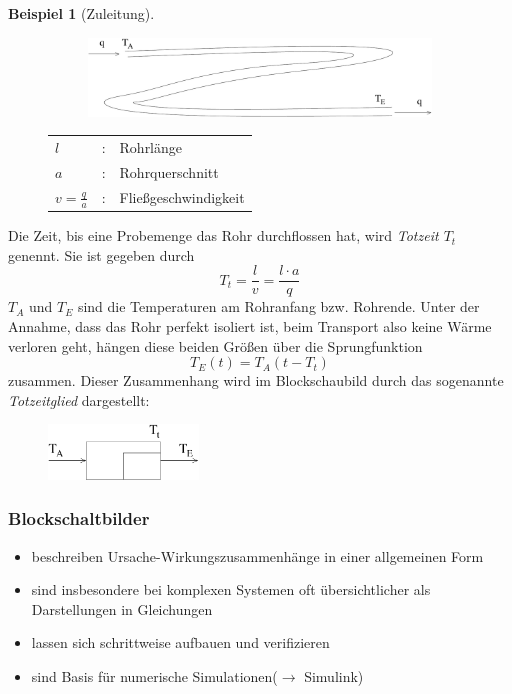\documentclass[12pt,a4paper,ngerman]{scrartcl}
\newtheorem{bsp}{Beispiel}[section] %
\begin{document}
\begin{bsp}[Zuleitung]
\end{bsp}
\begin{figure}[H]
\begin{minipage}{.6\linewidth}
\begin{figure}[H]
 \includegraphics[width=.9\linewidth]{sysregel_bsp_5} 
\end{figure}
\end{minipage}
\begin{minipage}{.4\linewidth}
\begin{tabular}{lll}
$l$&:& Rohrlänge\\
$a$&:&Rohrquerschnitt\\
$v=\frac{q}{a}$&:& Fließgeschwindigkeit
\end{tabular}
\end{minipage}
\end{figure}

Die Zeit, bis eine Probemenge das Rohr durchflossen hat, wird \emph{Totzeit $T_t$} genennt. Sie ist gegeben durch
\begin{equation*}
  T_t=\frac{l}{v}=\frac{l \cdot a}{q}
\end{equation*}
$T_A$ und $T_E$ sind die Temperaturen am Rohranfang bzw. Rohrende. Unter der Annahme, dass das Rohr perfekt isoliert ist, beim Transport also keine Wärme verloren geht, hängen diese beiden Größen über die Sprungfunktion
\begin{equation*}
  T_E(t)=T_A(t-T_t)
\end{equation*}
zusammen. Dieser Zusammenhang wird im Blockschaubild durch das sogenannte \emph{Totzeitglied} dargestellt:
\begin{figure}[H]
  \includegraphics[width=4cm]{sysregel_tglied}
\end{figure}
\fancyhead{}
\fancyhead[LO,LE]{\leftmark}
\subsubsection*{Blockschaltbilder}
\begin{itemize}
\item beschreiben Ursache-Wirkungszusammenhänge in einer allgemeinen Form
\item sind insbesondere bei komplexen Systemen oft übersichtlicher als Darstellungen in Gleichungen
\item lassen sich schrittweise aufbauen und verifizieren
\item sind Basis für numerische Simulationen($\rightarrow$ Simulink)
\end{itemize}
\end{document}

